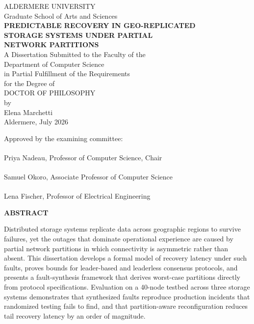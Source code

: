 \documentclass[12pt, oneside]{report}
\newcommand{\committeeline}[2]{%
  \noindent\makebox[3.4in]{\hrulefill}\\
  {#1, #2}\\[1.6em]}
\begin{document}
\begin{titlepage}
\begin{center}
\vspace*{0.4in}
{\large ALDERMERE UNIVERSITY}\\[0.15in]
{\large Graduate School of Arts and Sciences}\\[0.9in]

{\Large\bfseries PREDICTABLE RECOVERY IN GEO-REPLICATED\\[0.35em]
STORAGE SYSTEMS UNDER PARTIAL\\[0.35em]
NETWORK PARTITIONS}\\[0.9in]

A Dissertation Submitted to the Faculty of the\\
Department of Computer Science\\
in Partial Fulfillment of the Requirements\\
for the Degree of\\[0.4in]
{\large DOCTOR OF PHILOSOPHY}\\[0.6in]

by\\[0.3in]
{\large Elena Marchetti}\\[0.3in]
Aldermere, July 2026
\end{center}

\vspace{0.5in}
\begin{flushleft}
Approved by the examining committee:\\[2.2em]
\committeeline{Priya Nadeau}{Professor of Computer Science, Chair}
\committeeline{Samuel Okoro}{Associate Professor of Computer Science}
\committeeline{Lena Fischer}{Professor of Electrical Engineering}
\end{flushleft}
\end{titlepage}

\begin{center}
{\large\bfseries ABSTRACT}
\end{center}
\doublespacing
Distributed storage systems replicate data across geographic regions to survive
failures, yet the outages that dominate operational experience are caused by
partial network partitions in which connectivity is asymmetric rather than
absent. This dissertation develops a formal model of recovery latency under
such faults, proves bounds for leader-based and leaderless consensus protocols,
and presents a fault-synthesis framework that derives worst-case partitions
directly from protocol specifications. Evaluation on a 40-node testbed across
three storage systems demonstrates that synthesized faults reproduce production
incidents that randomized testing fails to find, and that partition-aware
reconfiguration reduces tail recovery latency by an order of magnitude.
\end{document}
